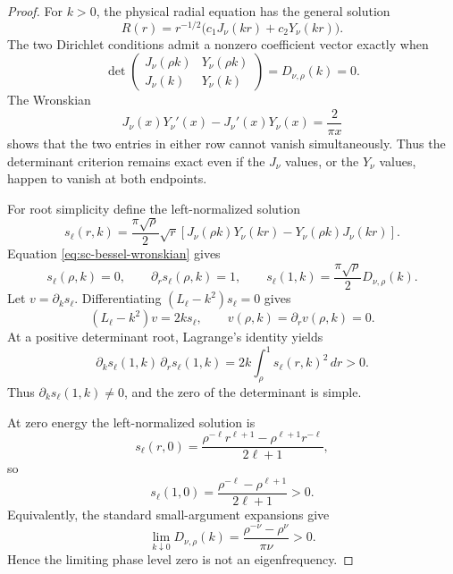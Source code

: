 \documentclass[11pt]{article}
\numberwithin{equation}{section}
\theoremstyle{definition}
\theoremstyle{remark}
\begin{document}
\begin{proof}
For \(k>0\), the physical radial equation has the general solution
\[
  R(r)=r^{-1/2}
  \bigl(c_1J_\nu(kr)+c_2Y_\nu(kr)\bigr).
\]
The two Dirichlet conditions admit a nonzero coefficient vector exactly when
\[
  \det\begin{pmatrix}
  J_\nu(\rho k)&Y_\nu(\rho k)\\
  J_\nu(k)&Y_\nu(k)
  \end{pmatrix}=D_{\nu,\rho}(k)=0.
\]
The Wronskian
\begin{equation}
  J_\nu(x)Y_\nu'(x)-J_\nu'(x)Y_\nu(x)=\frac2{\pi x}
  \label{eq:sc-bessel-wronskian}
\end{equation}
shows that the two entries in either row cannot vanish simultaneously.
Thus the determinant criterion remains exact even if the \(J_\nu\) values,
or the \(Y_\nu\) values, happen to vanish at both endpoints.

For root simplicity define the left-normalized solution
\begin{equation}
  s_\ell(r,k)=\frac{\pi\sqrt\rho}{2}\sqrt r
  \left[J_\nu(\rho k)Y_\nu(kr)
  -Y_\nu(\rho k)J_\nu(kr)\right].
  \label{eq:sc-left-normalized}
\end{equation}
Equation \eqref{eq:sc-bessel-wronskian} gives
\[
  s_\ell(\rho,k)=0,
  \qquad \partial_rs_\ell(\rho,k)=1,
  \qquad
  s_\ell(1,k)=\frac{\pi\sqrt\rho}{2}D_{\nu,\rho}(k).
\]
Let \(v=\partial_ks_\ell\).  Differentiating
\((L_\ell-k^2)s_\ell=0\) gives
\[
  (L_\ell-k^2)v=2ks_\ell,
  \qquad v(\rho,k)=\partial_rv(\rho,k)=0.
\]
At a positive determinant root, Lagrange's identity yields
\begin{equation}
  \partial_ks_\ell(1,k)\,\partial_rs_\ell(1,k)
  =2k\int_\rho^1s_\ell(r,k)^2\,dr>0.
  \label{eq:sc-root-simplicity}
\end{equation}
Thus \(\partial_ks_\ell(1,k)\ne0\), and the zero of the determinant is
simple.

At zero energy the left-normalized solution is
\[
  s_\ell(r,0)=
  \frac{\rho^{-\ell}r^{\ell+1}
  -\rho^{\ell+1}r^{-\ell}}{2\ell+1},
\]
so
\[
  s_\ell(1,0)=
  \frac{\rho^{-\ell}-\rho^{\ell+1}}{2\ell+1}>0.
\]
Equivalently, the standard small-argument expansions give
\begin{equation}
  \lim_{k\downarrow0}D_{\nu,\rho}(k)
  =\frac{\rho^{-\nu}-\rho^\nu}{\pi\nu}>0.
  \label{eq:sc-zero-determinant-limit}
\end{equation}
Hence the limiting phase level zero is not an eigenfrequency.


\end{proof}
\end{document}
